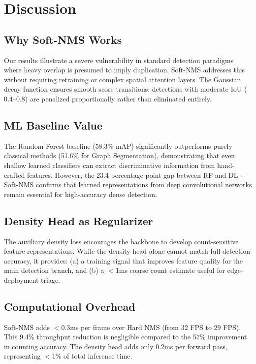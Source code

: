 \documentclass[conference]{IEEEtran}
\begin{document}
\section{Discussion}
\label{sec:discussion}

\subsection{Why Soft-NMS Works}
Our results illustrate a severe vulnerability in standard detection
paradigms where heavy overlap is presumed to imply duplication. Soft-NMS
addresses this without requiring retraining or complex spatial attention
layers. The Gaussian decay function ensures smooth score transitions:
detections with moderate IoU ($0.4$--$0.8$) are penalized proportionally
rather than eliminated entirely.

\subsection{ML Baseline Value}
The Random Forest baseline (58.3\% mAP) significantly outperforms
purely classical methods (51.6\% for Graph Segmentation), demonstrating
that even shallow learned classifiers can extract discriminative
information from hand-crafted features. However, the 23.4 percentage
point gap between RF and DL + Soft-NMS confirms that learned
representations from deep convolutional networks remain essential for
high-accuracy dense detection.

\subsection{Density Head as Regularizer}
The auxiliary density loss encourages the backbone to develop
count-sensitive feature representations. While the density head alone
cannot match full detection accuracy, it provides: (a) a training
signal that improves feature quality for the main detection branch,
and (b) a $<$1ms coarse count estimate useful for edge-deployment
triage.

\subsection{Computational Overhead}
Soft-NMS adds $<$0.3ms per frame over Hard NMS (from 32 FPS to
29 FPS). This 9.4\% throughput reduction is negligible compared to
the 57\% improvement in counting accuracy. The density head adds
only 0.2ms per forward pass, representing $<$1\% of total inference
time.
\end{document}
